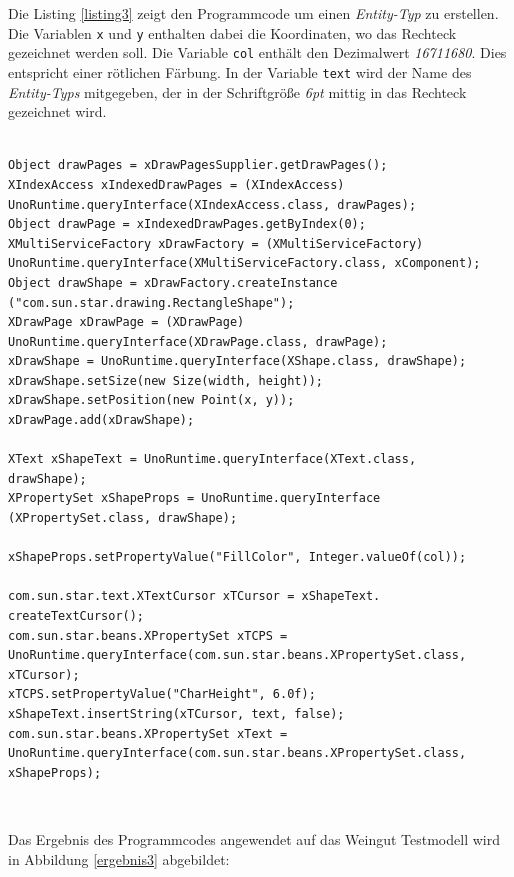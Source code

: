 \noindent
Die Listing \ref{listing3} zeigt den Programmcode um einen \textit{Entity-Typ} zu erstellen. Die Variablen \verb|x| und \verb|y| enthalten dabei die Koordinaten, wo das Rechteck gezeichnet werden soll. Die Variable \verb|col| enthält den Dezimalwert \textit{16711680}. Dies entspricht einer rötlichen Färbung. In der Variable \verb|text| wird der Name des \textit{Entity-Typs} mitgegeben, der in der Schriftgröße \textit{6pt} mittig in das Rechteck gezeichnet wird.

\noindent
\hon{}
\lstset{language=Java}
\lstset{frame=lines}
\lstset{basicstyle=\footnotesize}
\begin{lstlisting}

Object drawPages = xDrawPagesSupplier.getDrawPages();
XIndexAccess xIndexedDrawPages = (XIndexAccess) 
UnoRuntime.queryInterface(XIndexAccess.class, drawPages);
Object drawPage = xIndexedDrawPages.getByIndex(0);
XMultiServiceFactory xDrawFactory = (XMultiServiceFactory) 
UnoRuntime.queryInterface(XMultiServiceFactory.class, xComponent);
Object drawShape = xDrawFactory.createInstance
("com.sun.star.drawing.RectangleShape");
XDrawPage xDrawPage = (XDrawPage) 
UnoRuntime.queryInterface(XDrawPage.class, drawPage);
xDrawShape = UnoRuntime.queryInterface(XShape.class, drawShape);
xDrawShape.setSize(new Size(width, height));
xDrawShape.setPosition(new Point(x, y));
xDrawPage.add(xDrawShape);

XText xShapeText = UnoRuntime.queryInterface(XText.class, 
drawShape);
XPropertySet xShapeProps = UnoRuntime.queryInterface
(XPropertySet.class, drawShape);

xShapeProps.setPropertyValue("FillColor", Integer.valueOf(col));

com.sun.star.text.XTextCursor xTCursor = xShapeText.
createTextCursor();
com.sun.star.beans.XPropertySet xTCPS = 
UnoRuntime.queryInterface(com.sun.star.beans.XPropertySet.class,
xTCursor);
xTCPS.setPropertyValue("CharHeight", 6.0f);
xShapeText.insertString(xTCursor, text, false);
com.sun.star.beans.XPropertySet xText = 
UnoRuntime.queryInterface(com.sun.star.beans.XPropertySet.class,
xShapeProps);

\end{lstlisting}
\noindent
\\
\noindent

\hon{}
\noindent
Das Ergebnis des Programmcodes angewendet auf das Weingut Testmodell wird in Abbildung \ref{ergebnis3} abgebildet:

